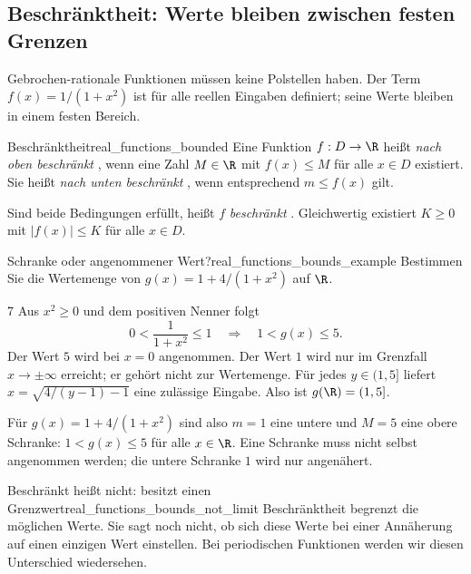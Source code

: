 \clearpage
\subsection{Beschränktheit: Werte bleiben zwischen festen Grenzen}
\label{subsec:real_functions_boundedness}
Gebrochen-rationale Funktionen müssen keine Polstellen haben.
Der Term $f(x)=1/(1+x^2)$ ist für alle reellen Eingaben definiert;
seine Werte bleiben in einem festen Bereich.
\begin{center}
\end{center}
\par\noindent\begin{minipage}{\linewidth}
\begin{FunctionPropertyBox}{Beschränktheit}{real_functions_bounded}
  Eine Funktion $f:D\to\R$ heißt \emph{nach oben beschränkt}
  , wenn eine Zahl $M\in\R$ mit
  $f(x)\le M$ für alle $x\in D$ existiert.
  Sie heißt \emph{nach unten beschränkt} ,
  wenn entsprechend $m\le f(x)$ gilt.

  Sind beide Bedingungen erfüllt, heißt $f$ \emph{beschränkt}
  . Gleichwertig existiert $K\ge0$ mit
  $|f(x)|\le K$ für alle $x\in D$.
\end{FunctionPropertyBox}
\begin{ExampleBox}[before skip=0.3\baselineskip]{Schranke oder angenommener Wert?}{real_functions_bounds_example}
  Bestimmen Sie die \textcolor{green!55!black}{Wertemenge} von $g(x)=1+4/(1+x^2)$ auf $\R$.
  \begin{ClozeArea}[34]{7}
    Aus $x^2\ge0$ und dem positiven Nenner folgt
    \[
      0<\frac1{1+x^2}\le1
      \quad\Longrightarrow\quad
      1<g(x)\le5.
    \]
    Der Wert $5$ wird bei $x=0$ angenommen. Der Wert $1$ wird nur
    im Grenzfall $x\to\pm\infty$ erreicht; er gehört nicht zur \textcolor{green!55!black}{Wertemenge}.
    Für jedes $y\in(1,5]$ liefert
    $x=\sqrt{4/(y-1)-1}$ eine zulässige Eingabe.
    Also ist $g(\R)=(1,5]$.
  \end{ClozeArea}
\end{ExampleBox}
\end{minipage}
\begin{center}
\end{center}
Für $g(x)=1+4/(1+x^2)$ sind also $m=1$ eine untere und $M=5$ eine
obere Schranke: $1<g(x)\le5$ für alle $x\in\R$. Eine Schranke muss
nicht selbst angenommen werden; die untere Schranke $1$ wird nur angenähert.

\begin{KeyPointBox}{Beschränkt heißt nicht: besitzt einen Grenzwert}{real_functions_bounds_not_limit}
  Beschränktheit begrenzt die möglichen Werte.
  Sie sagt noch nicht, ob sich diese Werte bei einer Annäherung auf
  einen einzigen Wert einstellen. Bei periodischen Funktionen werden
  wir diesen Unterschied wiedersehen.
\end{KeyPointBox}

